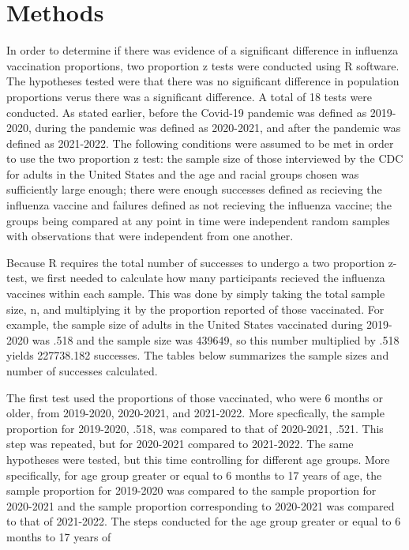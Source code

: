 \documentclass[12pt]{article}
\begin{document}
\section{Methods}
\label{sec:Methods}
In order to determine if there was evidence of a significant difference in influenza vaccination proportions, two proportion z tests were conducted using R software. The
hypotheses tested were that there was no significant difference in population proportions verus there was a significant difference. A total of 18 tests were conducted. As stated
earlier, before the Covid-19 pandemic was defined as 2019-2020, during the pandemic was defined as 2020-2021, and after the pandemic was defined as 2021-2022. The following conditions
were assumed to be met in order to use the two proportion z test: the sample size of those interviewed by the CDC for adults in the United States and the age and racial groups chosen
was sufficiently large enough; there were enough successes defined as recieving the influenza vaccine and failures defined as not recieving the influenza vaccine; the groups being compared
at any point in time were independent random samples with observations that were independent from one another. \par
Because R requires the total number of successes to undergo a two proportion z-test, we first needed to calculate how many participants recieved the influenza vaccines within each sample. This was done by simply
taking the total sample size, n, and multiplying it by the proportion reported of those vaccinated. For example, the sample size of adults in the United States vaccinated during 2019-2020 was .518 and
the sample size was 439649, so this number multiplied by .518 yields 227738.182 successes. The tables below summarizes the sample sizes and number of successes calculated. \par
The first test used the proportions of those vaccinated, who were 6 months or older, from 2019-2020, 2020-2021, and 2021-2022. More specfically, the sample proportion
for 2019-2020, .518, was compared to that of 2020-2021, .521. This step was repeated, but for 2020-2021 compared to 2021-2022. The same hypotheses were tested, but this time
controlling for different age groups. More specifically, for age group greater or equal to 6 months to 17 years of age, the sample proportion for 2019-2020 was compared to the sample
proportion for 2020-2021 and the sample proportion corresponding to 2020-2021 was compared to that of 2021-2022. The steps conducted for the age group greater or equal to 6 months to 17 years of 
\end{document}
